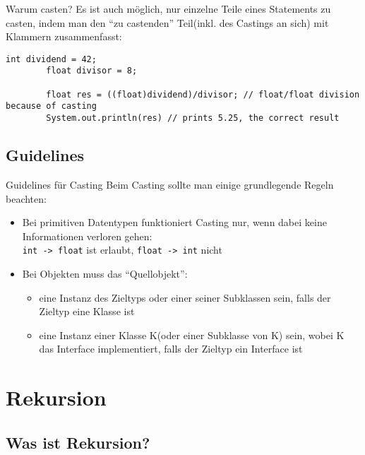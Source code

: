 \begin{frame}[fragile]{Warum casten?}
    Es ist auch möglich, nur einzelne Teile eines Statements zu casten, indem man den \enquote{zu castenden} Teil(inkl. des Castings an sich) mit Klammern zusammenfasst:
    \begin{lstlisting}[gobble=8]
        int dividend = 42;
        float divisor = 8;

        float res = ((float)dividend)/divisor; // float/float division because of casting
        System.out.println(res) // prints 5.25, the correct result
    \end{lstlisting}
\end{frame}


\subsection{Guidelines}

\begin{frame}{Guidelines für Casting}
    Beim Casting sollte man einige grundlegende Regeln beachten:
    \begin{itemize}[<+->]
        \item Bei primitiven Datentypen funktioniert Casting nur, wenn dabei keine Informationen verloren gehen:\\
            \texttt{int -> float} ist erlaubt, \texttt{float -> int} nicht
        \item Bei Objekten muss das \enquote{Quellobjekt}: \\
            \begin{itemize}
                \item eine Instanz des Zieltyps oder einer seiner Subklassen sein, falls der Zieltyp eine Klasse ist
                \item eine Instanz einer Klasse K(oder einer Subklasse von K) sein, wobei K das Interface implementiert, falls der Zieltyp ein Interface ist
            \end{itemize}
    \end{itemize}
\end{frame}

\section{Rekursion}
\subsection{Was ist Rekursion?}


